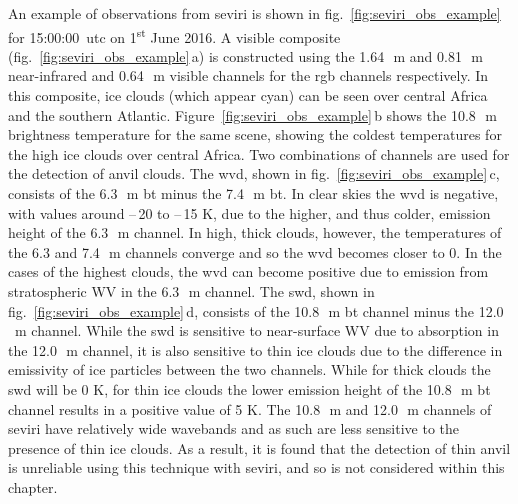 An example of observations from \acrshort{seviri} is shown in fig.~\ref{fig:seviri_obs_example} for 15:00:00~\acrshort{utc} on 1\textsuperscript{st} June 2016. 
A visible composite (fig.~\ref{fig:seviri_obs_example}\,a) is constructed using the 1.64\,\unit{\mu m} and 0.81\,\unit{\mu m} near-infrared and 0.64\,\unit{\mu m} visible channels for the \acrshort{rgb} channels respectively. 
In this composite, ice clouds (which appear cyan) can be seen over central Africa and the southern Atlantic. 
Figure~\ref{fig:seviri_obs_example}\,b shows the 10.8\,\unit{\mu m} brightness temperature for the same scene, showing the coldest temperatures for the high ice clouds over central Africa. 
Two combinations of channels are used for the detection of anvil clouds. 
The \acrshort{wvd}, shown in fig.~\ref{fig:seviri_obs_example}\,c, consists of the 6.3\,\unit{\mu m} \acrshort{bt} minus the 7.4\,\unit{\mu m} \acrshort{bt}. 
In clear skies the \acrshort{wvd} is negative, with values around --\,20 to --\,15 K, due to the higher, and thus colder, emission height of the 6.3\,\unit{\mu m} channel. 
In high, thick clouds, however, the temperatures of the 6.3 and 7.4\,\unit{\mu m} channels converge and so the \acrshort{wvd} becomes closer to 0. 
In the cases of the highest clouds, the \acrshort{wvd} can become positive due to emission from stratospheric WV in the 6.3\,\unit{\mu m} channel. The \acrshort{swd}, shown in fig.~\ref{fig:seviri_obs_example}\,d, consists of the 10.8\,\unit{\mu m} \acrshort{bt} channel minus the 12.0\,\unit{\mu m} channel. 
While the \acrshort{swd} is sensitive to near-surface WV due to absorption in the 12.0\,\unit{\mu m} channel, it is also sensitive to thin ice clouds due to the difference in emissivity of ice particles between the two channels. 
While for thick clouds the \acrshort{swd} will be 0 K, for thin ice clouds the lower emission height of the 10.8\,\unit{\mu m} \acrshort{bt} channel results in a positive value of 5 K.
The 10.8\,\unit{\mu m} and 12.0\,\unit{\mu m} channels of \acrshort{seviri} have relatively wide wavebands and as such are less sensitive to the presence of thin ice clouds.
As a result, it is found that the detection of thin anvil is unreliable using this technique with \acrshort{seviri}, and so is not considered within this chapter.



